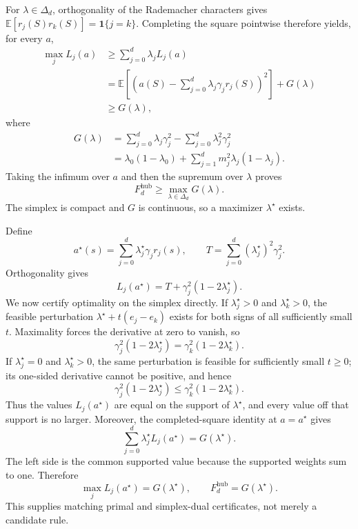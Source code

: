 For \(\lambda\in\Delta_d\), orthogonality of the Rademacher characters gives \(\mathbb E[r_j(S)r_k(S)]=\mathbf 1\{j=k\}\).  Completing the square pointwise therefore yields, for every \(a\),
\[
\begin{aligned}
 \max_jL_j(a)
 &\geq\sum_{j=0}^d\lambda_jL_j(a)\\
 &=\mathbb E\!\left[
 \left(a(S)-\sum_{j=0}^d\lambda_j\gamma_jr_j(S)\right)^2
 \right]+G(\lambda)\\
 &\geq G(\lambda),
\end{aligned}
\]
where
\[
\begin{aligned}
 G(\lambda)
 &=\sum_{j=0}^d\lambda_j\gamma_j^2
   -\sum_{j=0}^d\lambda_j^2\gamma_j^2\\
 &=\lambda_0(1-\lambda_0)
   +\sum_{j=1}^dm_j^2\lambda_j(1-\lambda_j).
\end{aligned}
\]
Taking the infimum over \(a\) and then the supremum over \(\lambda\) proves
\[
 F_d^{\mathrm{hub}}\geq\max_{\lambda\in\Delta_d}G(\lambda).
\]
The simplex is compact and \(G\) is continuous, so a maximizer \(\lambda^{\star}\) exists.

Define
\[
 a^{\star}(s)=\sum_{j=0}^d\lambda_j^{\star}\gamma_jr_j(s),
 \qquad
 T=\sum_{j=0}^d(\lambda_j^{\star})^2\gamma_j^2.
\]
Orthogonality gives
\[
 L_j(a^{\star})=T+\gamma_j^2(1-2\lambda_j^{\star}).
\]
We now certify optimality on the simplex directly.  If \(\lambda_j^{\star}>0\) and \(\lambda_k^{\star}>0\), the feasible perturbation \(\lambda^{\star}+t(e_j-e_k)\) exists for both signs of all sufficiently small \(t\).  Maximality forces the derivative at zero to vanish, so
\[
 \gamma_j^2(1-2\lambda_j^{\star})
 =\gamma_k^2(1-2\lambda_k^{\star}).
\]
If \(\lambda_j^{\star}=0\) and \(\lambda_k^{\star}>0\), the same perturbation is feasible for sufficiently small \(t\geq0\); its one-sided derivative cannot be positive, and hence
\[
 \gamma_j^2(1-2\lambda_j^{\star})
 \leq\gamma_k^2(1-2\lambda_k^{\star}).
\]
Thus the values \(L_j(a^{\star})\) are equal on the support of \(\lambda^{\star}\), and every value off that support is no larger.  Moreover, the completed-square identity at \(a=a^{\star}\) gives
\[
 \sum_{j=0}^d\lambda_j^{\star}L_j(a^{\star})=G(\lambda^{\star}).
\]
The left side is the common supported value because the supported weights sum to one.  Therefore
\[
 \max_jL_j(a^{\star})=G(\lambda^{\star}),
 \qquad
 F_d^{\mathrm{hub}}=G(\lambda^{\star}).
\]
This supplies matching primal and simplex-dual certificates, not merely a candidate rule.


